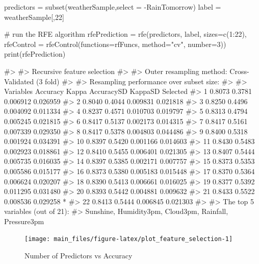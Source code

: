 \begin{Schunk}
\begin{Sinput}
predictors = subset(weatherSample,select = -RainTomorrow)
label = weatherSample[,22]

# run the RFE algorithm
rfePrediction = rfe(predictors, label, sizes=c(1:22), 
                    rfeControl = rfeControl(functions=rfFuncs, method="cv", number=3))
print(rfePrediction)
\end{Sinput}
\begin{Soutput}
#> 
#> Recursive feature selection
#> 
#> Outer resampling method: Cross-Validated (3 fold) 
#> 
#> Resampling performance over subset size:
#> 
#>  Variables Accuracy  Kappa AccuracySD  KappaSD Selected
#>          1   0.8073 0.3781   0.006912 0.026959         
#>          2   0.8040 0.4044   0.009831 0.021818         
#>          3   0.8250 0.4496   0.004092 0.011334         
#>          4   0.8237 0.4571   0.010703 0.019797         
#>          5   0.8313 0.4794   0.005245 0.021815         
#>          6   0.8417 0.5137   0.002173 0.014315         
#>          7   0.8417 0.5161   0.007339 0.029350         
#>          8   0.8417 0.5378   0.004803 0.044486         
#>          9   0.8400 0.5318   0.001924 0.034391         
#>         10   0.8397 0.5420   0.001166 0.014603         
#>         11   0.8430 0.5483   0.002923 0.018861         
#>         12   0.8410 0.5455   0.006401 0.021305         
#>         13   0.8407 0.5444   0.005735 0.016035         
#>         14   0.8397 0.5385   0.002171 0.007757         
#>         15   0.8373 0.5353   0.005586 0.015177         
#>         16   0.8373 0.5380   0.005183 0.015448         
#>         17   0.8370 0.5364   0.006624 0.020207         
#>         18   0.8390 0.5413   0.006661 0.016025         
#>         19   0.8377 0.5392   0.011295 0.031480         
#>         20   0.8393 0.5442   0.004881 0.009632         
#>         21   0.8433 0.5522   0.008536 0.029258        *
#>         22   0.8413 0.5444   0.006845 0.021303         
#> 
#> The top 5 variables (out of 21):
#>    Sunshine, Humidity3pm, Cloud3pm, Rainfall, Pressure3pm
\end{Soutput}
\end{Schunk}

\begin{Schunk}
\begin{figure}[H]

{\centering \texttt{[image: main\_files/figure-latex/plot\_feature\_selection-1]} 

}

\caption[Number of Predictors vs Accuracy]{Number of Predictors vs Accuracy}\label{fig:plot_feature_selection}
\end{figure}
\end{Schunk}

